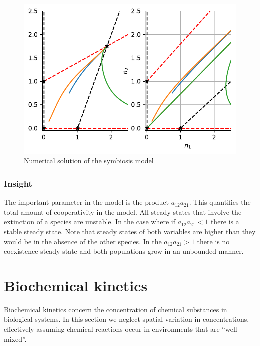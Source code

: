 \documentclass[
  letterpaper,
  DIV=11,
  numbers=noendperiod]{scrreprt}
\begin{document}
\begin{figure}

{\centering \includegraphics{ContinuousTimeTwoSepcies_files/figure-pdf/fig-sym-numsol-phplane-output-2.pdf}

}

\caption{\label{fig-sym-numsol-phplane}Numerical solution of the
symbiosis model}

\end{figure}

\hypertarget{insight-1}{%
\subsection{Insight}\label{insight-1}}

The important parameter in the model is the product \(a_{12}a_{21}\).
This quantifies the total amount of cooperativity in the model. All
steady states that involve the extinction of a species are unstable. In
the case where if \(a_{12}a_{21}<1\) there is a stable steady state.
Note that steady states of both variables are higher than they would be
in the absence of the other species. In the \(a_{12}a_{21}>1\) there is
no coexistence steady state and both populations grow in an unbounded
manner.

\hypertarget{biochemical-kinetics}{%
\chapter{Biochemical kinetics}\label{biochemical-kinetics}}

Biochemical kinetics concern the concentration of chemical substances in
biological systems. In this section we neglect spatial variation in
concentrations, effectively assuming chemical reactions occur in
environments that are ``well-mixed''.
\end{document}
